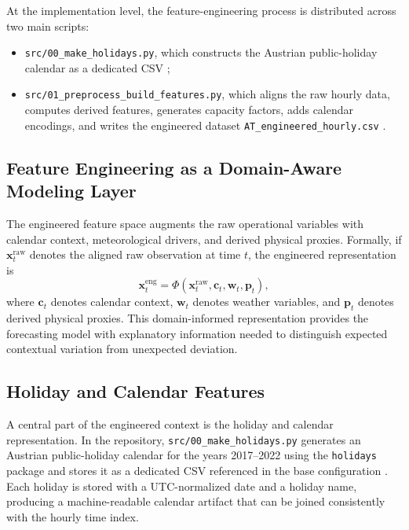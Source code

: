At the implementation level, the feature-engineering process is distributed across two main scripts:
\begin{itemize}
	\item \texttt{src/00\_make\_holidays.py}, which constructs the Austrian public-holiday calendar as a dedicated CSV \cite{repo_thesis_grid_anomaly};
	\item \texttt{src/01\_preprocess\_build\_features.py}, which aligns the raw hourly data, computes derived features, generates capacity factors, adds calendar encodings, and writes the engineered dataset \texttt{AT\_engineered\_hourly.csv} \cite{repo_thesis_grid_anomaly}.
\end{itemize}

\subsection{Feature Engineering as a Domain-Aware Modeling Layer}

The engineered feature space augments the raw operational variables with calendar context, meteorological drivers, and derived physical proxies. Formally, if $\mathbf{x}_t^{\mathrm{raw}}$ denotes the aligned raw observation at time $t$, the engineered representation is \begin{equation} \mathbf{x}_t^{\mathrm{eng}} = \Phi\!\left( \mathbf{x}_t^{\mathrm{raw}}, \mathbf{c}_t, \mathbf{w}_t, \mathbf{p}_t \right), \label{eq:feat_general} \end{equation} where $\mathbf{c}_t$ denotes calendar context, $\mathbf{w}_t$ denotes weather variables, and $\mathbf{p}_t$ denotes derived physical proxies. This domain-informed representation provides the forecasting model with explanatory information needed to distinguish expected contextual variation from unexpected deviation.

\subsection{Holiday and Calendar Features}

A central part of the engineered context is the holiday and calendar representation. In the repository, \texttt{src/00\_make\_holidays.py} generates an Austrian public-holiday calendar for the years 2017--2022 using the \texttt{holidays} package and stores it as a dedicated CSV referenced in the base configuration \cite{repo_thesis_grid_anomaly}. Each holiday is stored with a UTC-normalized date and a holiday name, producing a machine-readable calendar artifact that can be joined consistently with the hourly time index.

